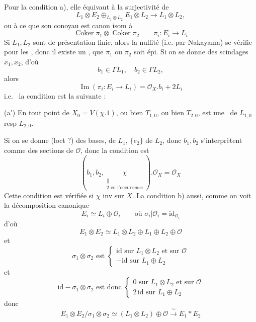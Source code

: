 \documentclass[11pt,a4paper]{article}
\begin{document}
Pour la condition a), elle équivaut à la surjectivité de
\[
  L_1 \otimes E_2 \oplus_{L_1 \otimes L_2} E_1 \otimes L_2 \longrightarrow L_1 \otimes L_2 ,
\]
ou à ce que son conoyau est canon isom à
\[
  \operatorname{Coker} \pi_1 \otimes \operatorname{Coker} \pi_2 \qquad \pi_i : E_i \to L_i
\]
Si $L_1, L_2$ sont de \struck{\ill{}} présentation finie, alors la nullité (i.e. par Nakayama) se vérifie pour les  , donc il existe un  , que $\pi_1$ \struck{\ill{}} ou $\pi_2$ soit épi. Si on se donne des scindages $x_1, x_2$, d'où
\[
  b_1 \in \Gamma L_1 , \quad b_2 \in \Gamma L_2 ,
\]
alors
\[
  \operatorname{Im}(\pi_i : E_i \to L_i) = \mathcal{O}_X . b_i + 2 L_i
\]
i.e.\ \ill{} la condition est la suivante :

(a$'$)  En tout point de $X_0 = V(\chi . 1)$,  \add{\ill{}} ou bien $T_{1,0}$, ou bien $T_{2,0}$, est une  \ de $L_{1,0}$ resp $L_{2,0}$.

Si on se donne (loct ?) des bases, \struck{\ill{}}  de $L_1$, $\{e_2\}$ de $L_2$, donc $b_1, b_2$ s'interprètent comme des sections de $\mathcal{O}$, donc la condition est
\[
  (b_1, b_2, \underset{\substack{\| \\ 2 \text{ en l'occurrence}}}{\chi}) . \mathcal{O}_X = \mathcal{O}_X
\]
Cette condition est vérifiée si $\chi$  inv sur  $X$. La condition b) aussi, comme on voit \struck{\ill{}} la décomposition canonique
\[
  E_i \simeq L_i \oplus \mathcal{O}_i \qquad \text{où } \sigma_i | \mathcal{O}_i = \mathrm{id}_{\mathcal{O}_i}
\]
d'où
\[
  E_1 \otimes E_2 \simeq L_1 \otimes L_2 \oplus L_1 \oplus L_2 \oplus \mathcal{O}
\]
et
\[
  \sigma_1 \otimes \sigma_2 \text{ est }
  \begin{cases}
    \mathrm{id} \text{ sur } L_1 \otimes L_2 \text{ et sur } \mathcal{O} \\
    -\mathrm{id} \text{ sur } L_1 \oplus L_2
  \end{cases}
\]
et
\[
  \mathrm{id} - \sigma_1 \otimes \sigma_2 \text{ est donc }
  \begin{cases}
    0 \text{ sur } L_1 \otimes L_2 \text{ et sur } \mathcal{O} \\
    2\,\mathrm{id} \text{ sur } L_1 \oplus L_2
  \end{cases}
\]
donc
\[
  E_1 \otimes E_2 / \sigma_1 \otimes \sigma_2 \simeq (L_1 \otimes L_2) \oplus \mathcal{O} \xrightarrow{\ \sim\ } E_1 * E_2
\]
\end{document}
